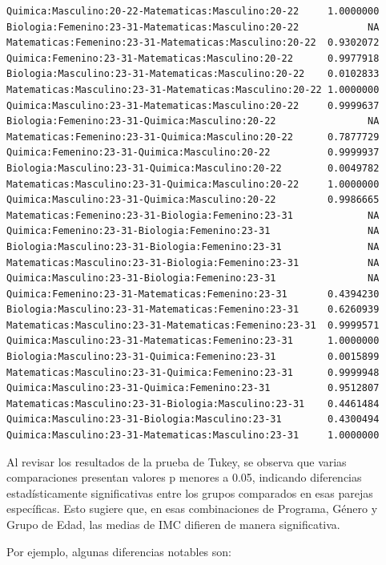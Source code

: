 \documentclass{rapport}
\begin{document}
\begin{itemize}
\begin{verbatim}
Quimica:Masculino:20-22-Matematicas:Masculino:20-22     1.0000000
Biologia:Femenino:23-31-Matematicas:Masculino:20-22            NA
Matematicas:Femenino:23-31-Matematicas:Masculino:20-22  0.9302072
Quimica:Femenino:23-31-Matematicas:Masculino:20-22      0.9977918
Biologia:Masculino:23-31-Matematicas:Masculino:20-22    0.0102833
Matematicas:Masculino:23-31-Matematicas:Masculino:20-22 1.0000000
Quimica:Masculino:23-31-Matematicas:Masculino:20-22     0.9999637
Biologia:Femenino:23-31-Quimica:Masculino:20-22                NA
Matematicas:Femenino:23-31-Quimica:Masculino:20-22      0.7877729
Quimica:Femenino:23-31-Quimica:Masculino:20-22          0.9999937
Biologia:Masculino:23-31-Quimica:Masculino:20-22        0.0049782
Matematicas:Masculino:23-31-Quimica:Masculino:20-22     1.0000000
Quimica:Masculino:23-31-Quimica:Masculino:20-22         0.9986665
Matematicas:Femenino:23-31-Biologia:Femenino:23-31             NA
Quimica:Femenino:23-31-Biologia:Femenino:23-31                 NA
Biologia:Masculino:23-31-Biologia:Femenino:23-31               NA
Matematicas:Masculino:23-31-Biologia:Femenino:23-31            NA
Quimica:Masculino:23-31-Biologia:Femenino:23-31                NA
Quimica:Femenino:23-31-Matematicas:Femenino:23-31       0.4394230
Biologia:Masculino:23-31-Matematicas:Femenino:23-31     0.6260939
Matematicas:Masculino:23-31-Matematicas:Femenino:23-31  0.9999571
Quimica:Masculino:23-31-Matematicas:Femenino:23-31      1.0000000
Biologia:Masculino:23-31-Quimica:Femenino:23-31         0.0015899
Matematicas:Masculino:23-31-Quimica:Femenino:23-31      0.9999948
Quimica:Masculino:23-31-Quimica:Femenino:23-31          0.9512807
Matematicas:Masculino:23-31-Biologia:Masculino:23-31    0.4461484
Quimica:Masculino:23-31-Biologia:Masculino:23-31        0.4300494
Quimica:Masculino:23-31-Matematicas:Masculino:23-31     1.0000000    
\end{verbatim}

Al revisar los resultados de la prueba de Tukey, se observa que varias comparaciones presentan valores p menores a 0.05, indicando diferencias estadísticamente significativas entre los grupos comparados en esas parejas específicas. Esto sugiere que, en esas combinaciones de Programa, Género y Grupo de Edad, las medias de IMC difieren de manera significativa.

Por ejemplo, algunas diferencias notables son:


\end{itemize}
\end{document}

